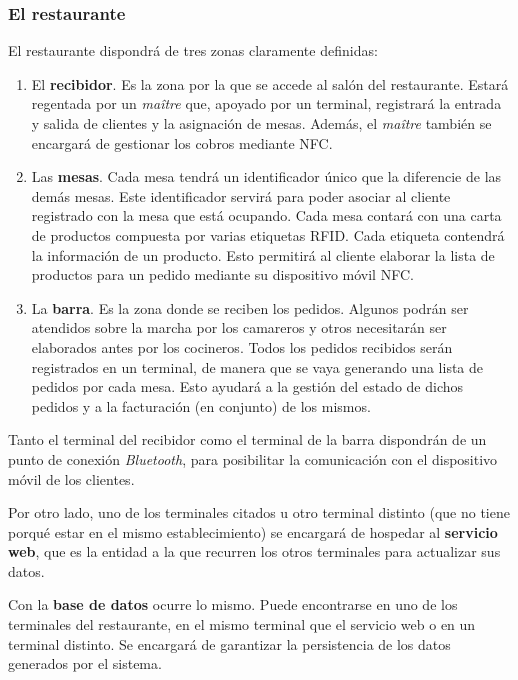     \subsubsection{El restaurante}
  El restaurante dispondrá de tres zonas claramente definidas:
  \begin{enumerate}
  \item El \textbf{recibidor}. Es la zona por la que se accede al salón del
  restaurante. Estará regentada por un \emph{maître} que, apoyado por un 
  terminal, registrará la entrada y salida de clientes y la asignación de 
  mesas. Además, el \emph{maître} también se encargará de gestionar los cobros 
  mediante \acs{NFC}.
  \item Las \textbf{mesas}. Cada mesa tendrá un identificador único que la
  diferencie de las demás mesas. Este identificador servirá para poder
  asociar al cliente registrado con la mesa que está ocupando. Cada mesa
  contará con una carta de productos compuesta por varias etiquetas
  \acs{RFID}. Cada etiqueta contendrá la información de un producto. Esto 
  permitirá al cliente elaborar la lista de productos para un pedido
  mediante su dispositivo móvil \acs{NFC}.
  \item La \textbf{barra}. Es la zona donde se reciben los pedidos. Algunos
  podrán ser atendidos sobre la marcha por los camareros y otros necesitarán
  ser elaborados antes por los cocineros. Todos los pedidos recibidos serán
  registrados en un terminal, de manera que se vaya generando una lista de
  pedidos por cada mesa. Esto ayudará a la gestión del estado de dichos 
  pedidos y a la facturación (en conjunto) de los mismos.
  \end{enumerate}

  Tanto el terminal del recibidor como el terminal de la barra dispondrán
  de un punto de conexión \emph{Bluetooth}, para posibilitar la comunicación
  con el dispositivo móvil de los clientes.

  Por otro lado, uno de los terminales citados u otro terminal distinto (que
  no tiene porqué estar en el mismo establecimiento) se encargará de hospedar
  al \textbf{servicio web}, que es la entidad a la que recurren los otros
  terminales para actualizar sus datos.

  Con la \textbf{base de datos} ocurre lo mismo. Puede encontrarse en uno de
  los terminales del restaurante, en el mismo terminal que el servicio web o
  en un terminal distinto. Se encargará de garantizar la persistencia de los
  datos generados por el sistema.

